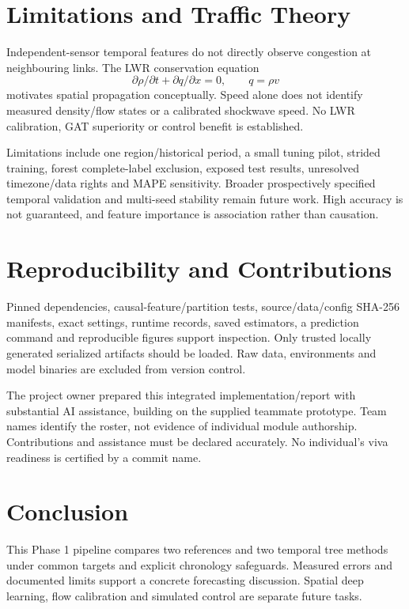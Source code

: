 \documentclass[conference]{IEEEtran}
\begin{document}
\section{Limitations and Traffic Theory}
Independent-sensor temporal features do not directly observe congestion at neighbouring links. The LWR conservation equation
\begin{equation}
\partial\rho/\partial t+\partial q/\partial x=0,\qquad q=\rho v
\end{equation}
motivates spatial propagation conceptually. Speed alone does not identify measured density/flow states or a calibrated shockwave speed. No LWR calibration, GAT superiority or control benefit is established.

Limitations include one region/historical period, a small tuning pilot, strided training, forest complete-label exclusion, exposed test results, unresolved timezone/data rights and MAPE sensitivity. Broader prospectively specified temporal validation and multi-seed stability remain future work. High accuracy is not guaranteed, and feature importance is association rather than causation.

\section{Reproducibility and Contributions}
Pinned dependencies, causal-feature/partition tests, source/data/config SHA-256 manifests, exact settings, runtime records, saved estimators, a prediction command and reproducible figures support inspection. Only trusted locally generated serialized artifacts should be loaded. Raw data, environments and model binaries are excluded from version control.

The project owner prepared this integrated implementation/report with substantial AI assistance, building on the supplied teammate prototype. Team names identify the roster, not evidence of individual module authorship. Contributions and assistance must be declared accurately. No individual's viva readiness is certified by a commit name.

\section{Conclusion}
This Phase 1 pipeline compares two references and two temporal tree methods under common targets and explicit chronology safeguards. Measured errors and documented limits support a concrete forecasting discussion. Spatial deep learning, flow calibration and simulated control are separate future tasks.
\end{document}
